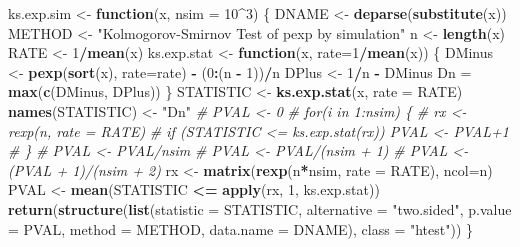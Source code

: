 \documentclass[]{book}
\newenvironment{Shaded}{\begin{snugshade}}{\end{snugshade}}
\newcommand{\KeywordTok}[1]{\textcolor[rgb]{0.13,0.29,0.53}{\textbf{#1}}}
\newcommand{\DataTypeTok}[1]{\textcolor[rgb]{0.13,0.29,0.53}{#1}}
\newcommand{\DecValTok}[1]{\textcolor[rgb]{0.00,0.00,0.81}{#1}}
\newcommand{\StringTok}[1]{\textcolor[rgb]{0.31,0.60,0.02}{#1}}
\newcommand{\CommentTok}[1]{\textcolor[rgb]{0.56,0.35,0.01}{\textit{#1}}}
\newcommand{\ControlFlowTok}[1]{\textcolor[rgb]{0.13,0.29,0.53}{\textbf{#1}}}
\newcommand{\OperatorTok}[1]{\textcolor[rgb]{0.81,0.36,0.00}{\textbf{#1}}}
\newcommand{\NormalTok}[1]{#1}
\theoremstyle{definition}
\theoremstyle{definition}
\theoremstyle{definition}
\theoremstyle{remark}
\begin{document}
\begin{enumerate}
\begin{Shaded}
\begin{Highlighting}[]
\NormalTok{ks.exp.sim <-}\StringTok{ }\ControlFlowTok{function}\NormalTok{(x, }\DataTypeTok{nsim =} \DecValTok{10}\OperatorTok{^}\DecValTok{3}\NormalTok{) \{}
\NormalTok{  DNAME <-}\StringTok{ }\KeywordTok{deparse}\NormalTok{(}\KeywordTok{substitute}\NormalTok{(x))}
\NormalTok{  METHOD <-}\StringTok{ "Kolmogorov-Smirnov Test of pexp by simulation"} 
\NormalTok{  n <-}\StringTok{ }\KeywordTok{length}\NormalTok{(x)}
\NormalTok{  RATE <-}\StringTok{ }\DecValTok{1}\OperatorTok{/}\KeywordTok{mean}\NormalTok{(x)}
\NormalTok{  ks.exp.stat <-}\StringTok{ }\ControlFlowTok{function}\NormalTok{(x, }\DataTypeTok{rate=}\DecValTok{1}\OperatorTok{/}\KeywordTok{mean}\NormalTok{(x)) \{}
\NormalTok{    DMinus <-}\StringTok{ }\KeywordTok{pexp}\NormalTok{(}\KeywordTok{sort}\NormalTok{(x), }\DataTypeTok{rate=}\NormalTok{rate) }\OperatorTok{-}\StringTok{ }\NormalTok{(}\DecValTok{0}\OperatorTok{:}\NormalTok{(n }\OperatorTok{-}\StringTok{ }\DecValTok{1}\NormalTok{))}\OperatorTok{/}\NormalTok{n}
\NormalTok{    DPlus <-}\StringTok{ }\DecValTok{1}\OperatorTok{/}\NormalTok{n }\OperatorTok{-}\StringTok{ }\NormalTok{DMinus}
\NormalTok{    Dn =}\StringTok{ }\KeywordTok{max}\NormalTok{(}\KeywordTok{c}\NormalTok{(DMinus, DPlus))}
\NormalTok{  \}  }
\NormalTok{  STATISTIC <-}\StringTok{ }\KeywordTok{ks.exp.stat}\NormalTok{(x, }\DataTypeTok{rate =}\NormalTok{ RATE) }
  \KeywordTok{names}\NormalTok{(STATISTIC) <-}\StringTok{ "Dn"}
  \CommentTok{# PVAL <- 0}
  \CommentTok{# for(i in 1:nsim) \{}
  \CommentTok{#   rx <- rexp(n, rate = RATE)}
  \CommentTok{#   if (STATISTIC <= ks.exp.stat(rx)) PVAL <- PVAL+1}
  \CommentTok{# \}}
  \CommentTok{# PVAL <- PVAL/nsim}
  \CommentTok{# PVAL <- PVAL/(nsim + 1)}
  \CommentTok{# PVAL <- (PVAL + 1)/(nsim + 2)}
\NormalTok{  rx <-}\StringTok{ }\KeywordTok{matrix}\NormalTok{(}\KeywordTok{rexp}\NormalTok{(n}\OperatorTok{*}\NormalTok{nsim, }\DataTypeTok{rate =}\NormalTok{ RATE), }\DataTypeTok{ncol=}\NormalTok{n)}
\NormalTok{  PVAL <-}\StringTok{ }\KeywordTok{mean}\NormalTok{(STATISTIC }\OperatorTok{<=}\StringTok{ }\KeywordTok{apply}\NormalTok{(rx, }\DecValTok{1}\NormalTok{, ks.exp.stat))}
  \KeywordTok{return}\NormalTok{(}\KeywordTok{structure}\NormalTok{(}\KeywordTok{list}\NormalTok{(}\DataTypeTok{statistic =}\NormalTok{ STATISTIC, }\DataTypeTok{alternative =} \StringTok{"two.sided"}\NormalTok{, }
                   \DataTypeTok{p.value =}\NormalTok{ PVAL, }\DataTypeTok{method =}\NormalTok{ METHOD, }\DataTypeTok{data.name =}\NormalTok{ DNAME), }
                   \DataTypeTok{class =} \StringTok{"htest"}\NormalTok{))}
\NormalTok{\}}
\end{Highlighting}
\end{Shaded}


\end{enumerate}
\end{document}
